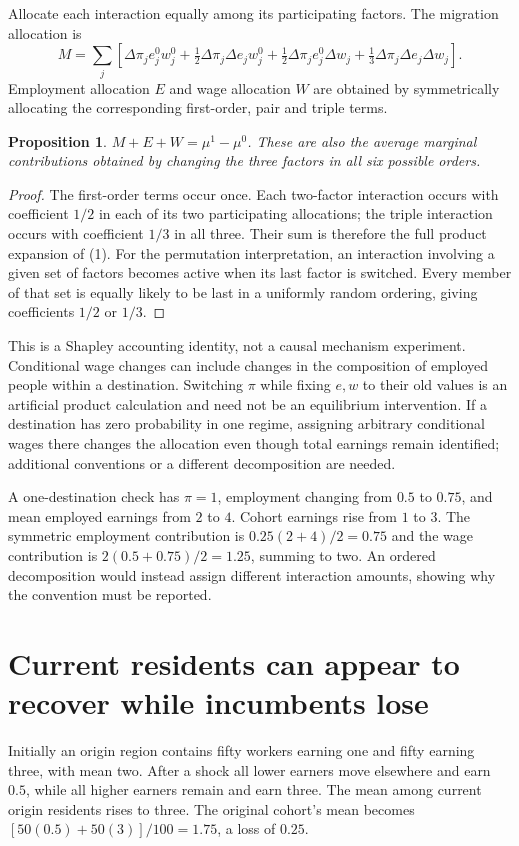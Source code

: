 \documentclass[11pt,a4paper]{article}
\newtheorem{proposition}[theorem]{Proposition}
\begin{document}
Allocate each interaction equally among its participating factors. The migration allocation is
\[
 M=\sum_j\left[
 \Delta\pi_j e_j^0w_j^0+\tfrac12\Delta\pi_j\Delta e_jw_j^0
 +\tfrac12\Delta\pi_je_j^0\Delta w_j
 +\tfrac13\Delta\pi_j\Delta e_j\Delta w_j\right].
\tag{2}
\]
Employment allocation $E$ and wage allocation $W$ are obtained by symmetrically allocating the corresponding first-order, pair and triple terms.
\begin{proposition}
$M+E+W=\mu^1-\mu^0$. These are also the average marginal contributions obtained by changing the three factors in all six possible orders.
\end{proposition}
\begin{proof}
The first-order terms occur once. Each two-factor interaction occurs with coefficient $1/2$ in each of its two participating allocations; the triple interaction occurs with coefficient $1/3$ in all three. Their sum is therefore the full product expansion of (1). For the permutation interpretation, an interaction involving a given set of factors becomes active when its last factor is switched. Every member of that set is equally likely to be last in a uniformly random ordering, giving coefficients $1/2$ or $1/3$.
\end{proof}
This is a Shapley accounting identity, not a causal mechanism experiment. Conditional wage changes can include changes in the composition of employed people within a destination. Switching $\pi$ while fixing $e,w$ to their old values is an artificial product calculation and need not be an equilibrium intervention. If a destination has zero probability in one regime, assigning arbitrary conditional wages there changes the allocation even though total earnings remain identified; additional conventions or a different decomposition are needed.

A one-destination check has $\pi=1$, employment changing from $0.5$ to $0.75$, and mean employed earnings from $2$ to $4$. Cohort earnings rise from $1$ to $3$. The symmetric employment contribution is $0.25(2+4)/2=0.75$ and the wage contribution is $2(0.5+0.75)/2=1.25$, summing to two. An ordered decomposition would instead assign different interaction amounts, showing why the convention must be reported.

\section{Current residents can appear to recover while incumbents lose}
Initially an origin region contains fifty workers earning one and fifty earning three, with mean two. After a shock all lower earners move elsewhere and earn $0.5$, while all higher earners remain and earn three. The mean among current origin residents rises to three. The original cohort's mean becomes
$[50(0.5)+50(3)]/100=1.75$, a loss of $0.25$.
\end{document}
